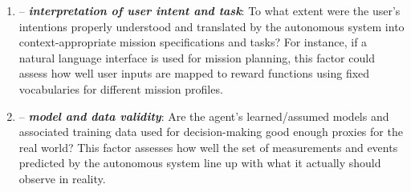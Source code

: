     
\begin{enumerate}
\item \xI -- \textit{\textbf{interpretation of user intent and task}}: To what extent were the user's intentions properly understood and translated by the autonomous system into context-appropriate mission specifications and tasks? 
For instance, if a natural language interface is used for mission planning, this factor could assess how well user inputs are mapped to reward functions using fixed vocabularies for different mission profiles. 
%
\item \xM -- \textit{\textbf{model and data validity}}: Are the agent's learned/assumed models and associated training data used for decision-making good enough proxies for the real world? This factor assesses how well the set of measurements and events predicted by the autonomous system line up with what it actually should observe in reality. 


\end{enumerate}
